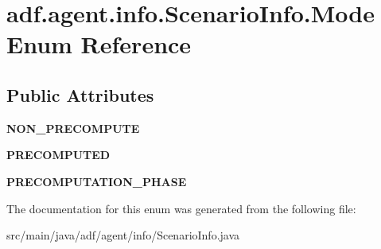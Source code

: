 \hypertarget{enumadf_1_1agent_1_1info_1_1ScenarioInfo_1_1Mode}{}\section{adf.\+agent.\+info.\+Scenario\+Info.\+Mode Enum Reference}
\label{enumadf_1_1agent_1_1info_1_1ScenarioInfo_1_1Mode}
\subsection*{Public Attributes}
\begin{DoxyCompactItemize}
\item 
\hypertarget{enumadf_1_1agent_1_1info_1_1ScenarioInfo_1_1Mode_ae0a241687507036a1f7da42e13069082}{}\label{enumadf_1_1agent_1_1info_1_1ScenarioInfo_1_1Mode_ae0a241687507036a1f7da42e13069082} 
{\bfseries N\+O\+N\+\_\+\+P\+R\+E\+C\+O\+M\+P\+U\+TE}
\item 
\hypertarget{enumadf_1_1agent_1_1info_1_1ScenarioInfo_1_1Mode_aaffc664fd77e30f945597f0a986429c4}{}\label{enumadf_1_1agent_1_1info_1_1ScenarioInfo_1_1Mode_aaffc664fd77e30f945597f0a986429c4} 
{\bfseries P\+R\+E\+C\+O\+M\+P\+U\+T\+ED}
\item 
\hypertarget{enumadf_1_1agent_1_1info_1_1ScenarioInfo_1_1Mode_a4ed92b7b20620daae3aa374d16b7e4a2}{}\label{enumadf_1_1agent_1_1info_1_1ScenarioInfo_1_1Mode_a4ed92b7b20620daae3aa374d16b7e4a2} 
{\bfseries P\+R\+E\+C\+O\+M\+P\+U\+T\+A\+T\+I\+O\+N\+\_\+\+P\+H\+A\+SE}
\end{DoxyCompactItemize}


The documentation for this enum was generated from the following file\+:\begin{DoxyCompactItemize}
\item 
src/main/java/adf/agent/info/Scenario\+Info.\+java\end{DoxyCompactItemize}
